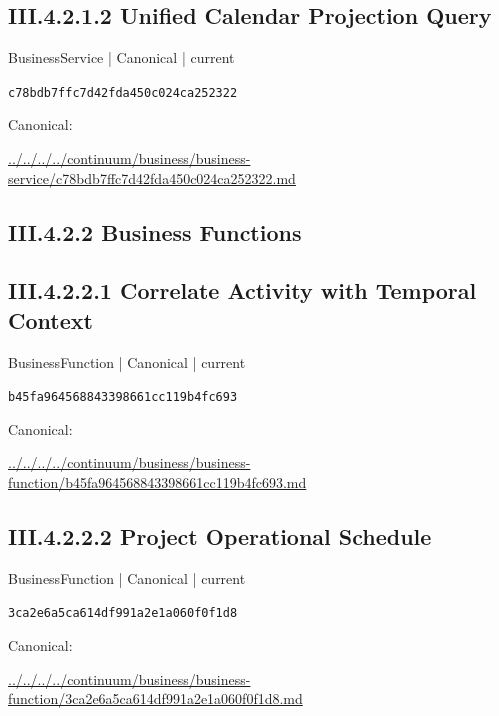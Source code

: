 \documentclass[10pt,a4paper]{article}
\begin{document}
\subsection*{III.4.2.1.2 Unified Calendar Projection Query}
{\small BusinessService | Canonical | current}\par
\texttt{c78bdb7ffc7d42fda450c024ca252322}\par
Canonical: \par
{\footnotesize\url{../../../../continuum/business/business-service/c78bdb7ffc7d42fda450c024ca252322.md}}\par
\subsection*{III.4.2.2 Business Functions}
\subsection*{III.4.2.2.1 Correlate Activity with Temporal Context}
{\small BusinessFunction | Canonical | current}\par
\texttt{b45fa964568843398661cc119b4fc693}\par
Canonical: \par
{\footnotesize\url{../../../../continuum/business/business-function/b45fa964568843398661cc119b4fc693.md}}\par
\subsection*{III.4.2.2.2 Project Operational Schedule}
{\small BusinessFunction | Canonical | current}\par
\texttt{3ca2e6a5ca614df991a2e1a060f0f1d8}\par
Canonical: \par
{\footnotesize\url{../../../../continuum/business/business-function/3ca2e6a5ca614df991a2e1a060f0f1d8.md}}\par
\end{document}
